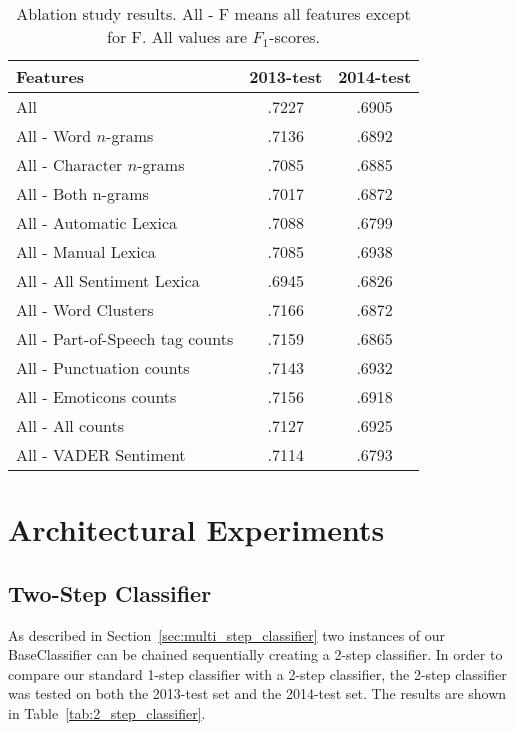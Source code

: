 \begin{table}[t]
    \centering
    \begin{tabular}{|l|c|c|}
        \hline
        \textbf{Features} & \textbf{2013-test} & \textbf{2014-test} \\ \hline
        All & .7227 & .6905 \\ \hline
        All - Word $n$-grams & .7136 & .6892 \\
        All - Character $n$-grams & .7085 & .6885 \\
        All - Both n-grams & .7017 & .6872 \\ \hline
        All - Automatic Lexica & .7088 & .6799 \\
        All - Manual Lexica & .7085 & .6938 \\
        All - All Sentiment Lexica & .6945 & .6826 \\ \hline
        All - Word Clusters & .7166 & .6872 \\ \hline
        All - Part-of-Speech tag counts & .7159 & .6865 \\
        All - Punctuation counts & .7143 & .6932 \\
        All - Emoticons counts & .7156 & .6918 \\ 
        All - All counts & .7127 & .6925 \\ \hline
        All - VADER Sentiment & .7114 & .6793 \\ \hline
    \end{tabular}
    \caption[Ablation study results]{Ablation study results. All - F means all features except for F. All values are $F_1$-scores.}
    \label{tab:ablation_study}   
\end{table}

\section{Architectural Experiments}

\subsection{Two-Step Classifier}
As described in Section~\ref{sec:multi_step_classifier} two instances of our BaseClassifier can be chained sequentially creating a 2-step classifier. In order to compare our standard 1-step classifier with a 2-step classifier, the 2-step classifier was tested on both the 2013-test set and the 2014-test set. The results are shown in Table~\ref{tab:2_step_classifier}.  \\

